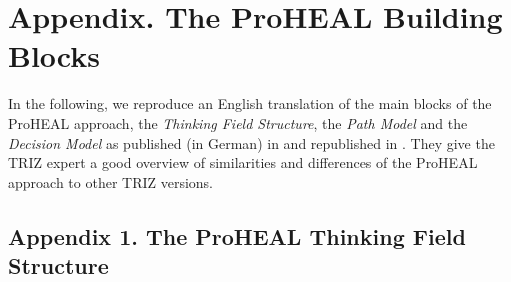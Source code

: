 \documentclass[12pt,a4paper]{article}
\begin{document}
\section*{Appendix. The ProHEAL Building Blocks}

In the following, we reproduce an English translation of the main blocks of
the ProHEAL approach, the \emph{Thinking Field Structure}, the \emph{Path
  Model} and the \emph{Decision Model} as published (in German) in
\cite[Appendix]{13} and republished in \cite[Appendix]{15}.  They give the
TRIZ expert a good overview of similarities and differences of the ProHEAL
approach to other TRIZ versions.

\subsection*{Appendix 1. The ProHEAL Thinking Field Structure}
\end{document}
